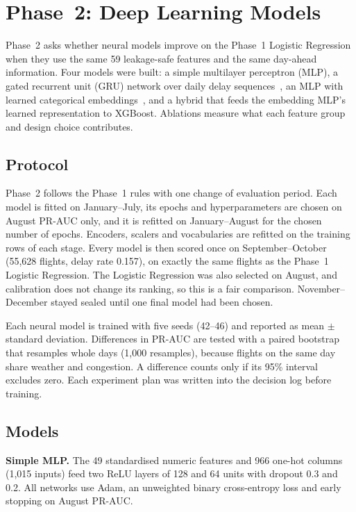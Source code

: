 \section{Phase~2: Deep Learning Models}
\label{sec:phase2}

Phase~2 asks whether neural models improve on the Phase~1 Logistic Regression when they use the
same 59 leakage-safe features and the same day-ahead information. Four models were built: a simple
multilayer perceptron (MLP), a gated recurrent unit (GRU) network over daily delay
sequences~\cite{cho2014gru}, an MLP with learned categorical embeddings~\cite{guo2016entity}, and a
hybrid that feeds the embedding MLP's learned representation to XGBoost. Ablations measure what
each feature group and design choice contributes.

\subsection{Protocol}
Phase~2 follows the Phase~1 rules with one change of evaluation period. Each model is fitted on
January--July, its epochs and hyperparameters are chosen on August PR-AUC only, and it is refitted
on January--August for the chosen number of epochs. Encoders, scalers and vocabularies are refitted
on the training rows of each stage. Every model is then scored once on September--October (55{,}628
flights, delay rate 0.157), on exactly the same flights as the Phase~1 Logistic Regression. The
Logistic Regression was also selected on August, and calibration does not change its ranking, so
this is a fair comparison. November--December stayed sealed until one final model had been chosen.

Each neural model is trained with five seeds (42--46) and reported as mean $\pm$ standard deviation.
Differences in PR-AUC are tested with a paired bootstrap that resamples whole days (1{,}000
resamples), because flights on the same day share weather and congestion. A difference counts only
if its 95\% interval excludes zero. Each experiment plan was written into the decision log before
training.

\subsection{Models}
\textbf{Simple MLP.} The 49 standardised numeric features and 966 one-hot columns (1{,}015 inputs)
feed two ReLU layers of 128 and 64 units with dropout 0.3 and 0.2. All networks use Adam, an
unweighted binary cross-entropy loss and early stopping on August PR-AUC.

